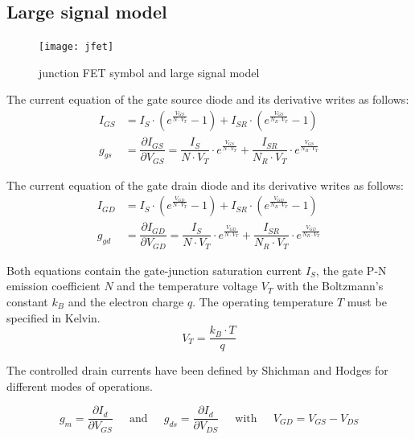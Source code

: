 \documentclass[10pt]{report}
\begin{document}
\subsection{Large signal model}

\begin{figure}[ht]
\begin{center}
\texttt{[image: jfet]}
\end{center}
\caption{junction FET symbol and large signal model}
\label{fig:jfet}
\end{figure}
\FloatBarrier

The current equation of the gate source diode and its derivative
writes as follows:
\begin{align}
I_{GS} &= I_{S}\cdot \left(e^{\frac{V_{GS}}{N\cdot V_{T}}} - 1\right) + I_{SR}\cdot \left(e^{\frac{V_{GS}}{N_{R}\cdot V_{T}}} - 1\right)\\
g_{gs} &= \dfrac{\partial I_{GS}}{\partial V_{GS}} = \dfrac{I_{S}}{N\cdot V_{T}}\cdot e^{\frac{V_{GS}}{N\cdot V_{T}}} + \dfrac{I_{SR}}{N_{R}\cdot V_{T}}\cdot e^{\frac{V_{GS}}{N_{R}\cdot V_{T}}}
\end{align}

The current equation of the gate drain diode and its derivative writes
as follows:
\begin{align}
I_{GD} &= I_{S}\cdot \left(e^{\frac{V_{GD}}{N\cdot V_{T}}} - 1\right) + I_{SR}\cdot \left(e^{\frac{V_{GD}}{N_{R}\cdot V_{T}}} - 1\right)\\
g_{gd} &= \dfrac{\partial I_{GD}}{\partial V_{GD}} = \dfrac{I_{S}}{N\cdot V_{T}}\cdot e^{\frac{V_{GD}}{N\cdot V_{T}}} + \dfrac{I_{SR}}{N_{R}\cdot V_{T}}\cdot e^{\frac{V_{GD}}{N_{R}\cdot V_{T}}}
\end{align}

Both equations contain the gate-junction saturation current $I_{S}$,
the gate P-N emission coefficient $N$ and the temperature voltage
$V_{T}$ with the Boltzmann's constant $k_{B}$ and the electron charge
$q$.  The operating temperature $T$ must be specified in Kelvin.
\begin{equation}
V_{T} = \dfrac{k_{B}\cdot T}{q}
\end{equation}

The controlled drain currents have been defined by Shichman and Hodges
\cite{Shichman} for different modes of operations.

\begin{equation}
g_{m} = \dfrac{\partial I_{d}}{\partial V_{GS}}
\;\;\;\; \text{ and } \;\;\;\;
g_{ds} = \dfrac{\partial I_{d}}{\partial V_{DS}}
\;\;\;\; \text{ with } \;\;\;\;
V_{GD} = V_{GS} - V_{DS}
\end{equation}
\end{document}
